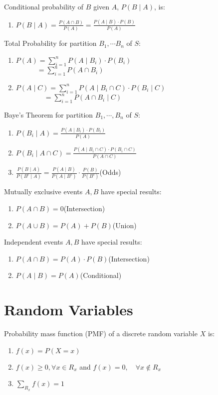\documentclass[12pt, a4paper]{article}
\begin{document}
\begin{multicols*}{3}
Conditional probability of $B$ given $A$, $P(B\mid A)$, is:
\begin{enumerate}[\roman*.]
  \item $P(B\mid A) = \displaystyle\frac{P(A\cap B)}{P(A)} = \frac{P(A\mid B)\cdot P(B)}{P(A)}$\hfill
\end{enumerate}

Total Probability for partition $B_1, \cdots B_n$ of $S$:
\begin{enumerate}[\roman*.]
  \item $P(A) = \displaystyle \sum^n_{i=1} P(A\mid B_i)\cdot P(B_i)$\\$\quad\quad\quad=\displaystyle \sum^n_{i=1}P(A\cap B_i)$
  \item $P(A\mid C) = \displaystyle \sum^n_{i=1} P(A\mid B_i \cap C)\cdot P(B_i\mid C)$\\$\quad\quad\quad\quad=\displaystyle \sum^n_{i=1} P(A\cap B_i\mid C)$
\end{enumerate}

Baye's Theorem for partition $B_1, \cdots, B_n$ of $S$:
\begin{enumerate}[\roman*.]
  \item $P(B_i\mid A) = \displaystyle \frac{P(A\mid B_i)\cdot P(B_i)}{P(A)}$
  \item $P(B_i\mid A \cap C) = \displaystyle \frac{P(A\mid B_i \cap C)\cdot P(B_i \cap C)}{P(A\cap C)}$
  \item $\displaystyle \frac{P(B\mid A)}{P(B^c\mid A)} = \frac{P(A\mid B)}{P(A\mid B^c)} \cdot \frac{P(B)}{P(B^c)}$\hfill(Odds)
\end{enumerate}

Mutually exclusive events $A,B$ have special results:
\begin{enumerate}[\roman*.]
  \item $P(A\cap B) = 0$\hfill(Intersection)
  \item $P(A\cup B) = P(A) + P(B)$\hfill(Union)
\end{enumerate}

Independent events $A,B$ have special results:
\begin{enumerate}[\roman*.]
  \item $P(A\cap B) = P(A)\cdot P(B)$\hfill(Intersection)
  \item $P(A\mid B) = P(A)$\hfill(Conditional)
\end{enumerate}

\colbreak
\section{Random Variables}
Probability mass function (PMF) of a discrete random variable $X$ is:
\begin{enumerate}[\roman*.]
  \item $f(x) = P(X=x)$
  \item $f(x) \geq 0, \forall x\in R_x$ and $f(x) = 0,\quad\forall x \not\in R_x$
  \item $\sum_{R_x} f(x) = 1$
\end{enumerate}


\end{multicols*}
\end{document}
